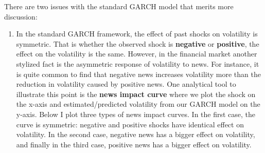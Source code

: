 \documentclass[]{book}
\providecommand{\tightlist}{%
  \setlength{\itemsep}{0pt}\setlength{\parskip}{0pt}}
\theoremstyle{definition}
\theoremstyle{definition}
\theoremstyle{definition}
\theoremstyle{remark}
\begin{document}
There are two issues with the standard GARCH model that merits more discussion:

\begin{enumerate}
\def\labelenumi{\arabic{enumi}.}
\tightlist
\item
  In the standard GARCH framework, the effect of past shocks on volatility is symmetric. That is whether the observed shock is \textbf{negative} or \textbf{positive}, the effect on the volatility is the same.
  However, in the financial market another stylized fact is the asymmetric response of volatility to news. For instance, it is quite common to find that negative news increases volatility more than the reduction in volatility caused by positive news. One analytical tool to illustrate this point is the \textbf{news impact curve} where we plot the shock on the x-axis and estimated/predicted volatility from our GARCH model on the y-axis. Below I plot three types of news impact curves. In the first case, the curve is symmetric: negative and positive shocks have identical effect on volatility. In the second case, negative news has a bigger effect on volatility, and finally in the third case, positive news has a bigger effect on volatility.
\end{enumerate}
\end{document}
